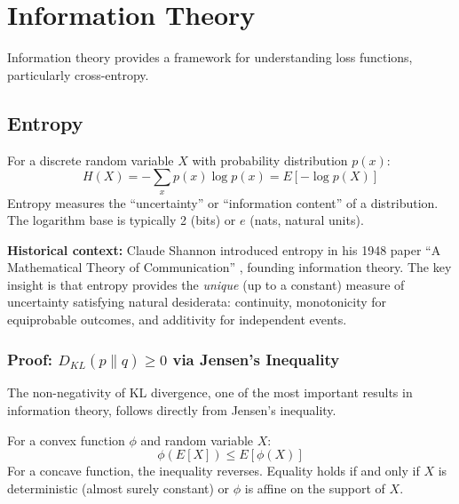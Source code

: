 \section{Information Theory}

Information theory provides a framework for understanding loss functions, particularly cross-entropy.

\subsection{Entropy}

\begin{definition}
For a discrete random variable $X$ with probability distribution $p(x)$:
\begin{equation}
H(X) = -\sum_{x} p(x) \log p(x) = E[-\log p(X)]
\end{equation}
Entropy measures the ``uncertainty'' or ``information content'' of a distribution. The logarithm base is typically 2 (bits) or $e$ (nats, natural units).
\end{definition}

\textbf{Historical context:} Claude Shannon introduced entropy in his 1948 paper ``A Mathematical Theory of Communication'' \cite{shannon1948mathematical}, founding information theory. The key insight is that entropy provides the \emph{unique} (up to a constant) measure of uncertainty satisfying natural desiderata: continuity, monotonicity for equiprobable outcomes, and additivity for independent events.

\subsubsection{Proof: \texorpdfstring{$D_{KL}(p \| q) \geq 0$}{D_KL(p || q) >= 0} via Jensen's Inequality}

The non-negativity of KL divergence, one of the most important results in information theory, follows directly from Jensen's inequality.

\begin{theorem}
For a convex function $\phi$ and random variable $X$:
\begin{equation}
\phi(E[X]) \leq E[\phi(X)]
\end{equation}
For a concave function, the inequality reverses. Equality holds if and only if $X$ is deterministic (almost surely constant) or $\phi$ is affine on the support of $X$.
\end{theorem}


